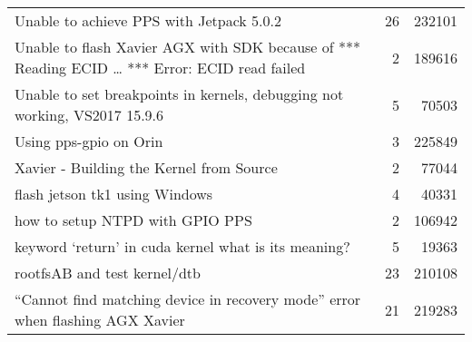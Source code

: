 \begin{longtable}{p{}rr}
Unable to achieve PPS with Jetpack 5.0.2&26&232101\\
Unable to flash Xavier AGX with SDK because of *** Reading ECID … *** Error: ECID read failed&2&189616\\
Unable to set breakpoints in kernels, debugging not working, VS2017 15.9.6&5&70503\\
Using pps-gpio on Orin&3&225849\\
Xavier - Building the Kernel from Source&2&77044\\
flash jetson tk1 using Windows &4&40331\\
how to setup NTPD with GPIO PPS&2&106942\\
keyword ‘return’ in cuda kernel what is its meaning?&5&19363\\
rootfsAB and test kernel/dtb&23&210108\\
“Cannot find matching device in recovery mode” error when flashing AGX Xavier&21&219283
\end{longtable}
